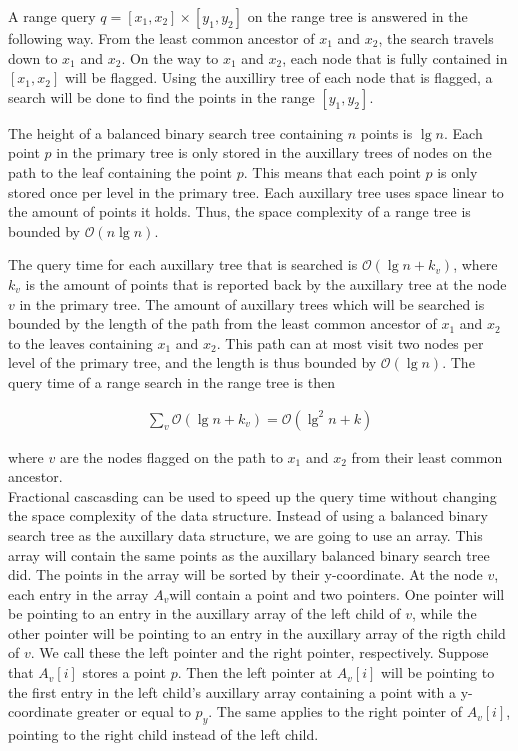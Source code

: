 A range query $q = [x_1, x_2] \times [y_1, y_2]$ on the range tree is answered in the following way. From the least common ancestor of $x_1$ and $x_2$, the search travels down to $x_1$ and $x_2$. On the way to $x_1$ and $x_2$, each node that is fully contained in $[x_1, x_2]$ will be flagged. Using the auxilliry tree of each node that is flagged, a search will be done to find the points in the range $[y_1, y_2]$.

The height of a balanced binary search tree containing $n$ points is $\lg n$. Each point $p$ in the primary tree is only stored in the auxillary trees of nodes on the path to the leaf containing the point $p$. This means that each point $p$ is only stored once per level in the primary tree. Each auxillary tree uses space linear to the amount of points it holds. Thus, the space complexity of a range tree is bounded by $\mathcal{O}(n \lg n)$.

The query time for each auxillary tree that is searched is $\mathcal{O}(\lg n + k_v)$, where $k_v$ is the amount of points that is reported back by the auxillary tree at the node $v$ in the primary tree. The amount of auxillary trees which will be searched is bounded by the length of the path from the least common ancestor of $x_1$ and $x_2$ to the leaves containing $x_1$ and $x_2$. This path can at most visit two nodes per level of the primary tree, and the length is thus bounded by $\mathcal{O}(\lg n)$. The query time of a range search in the range tree is then 

\begin{align*}
  \sum\limits_{v} \mathcal{O}(\lg n + k_v) = \mathcal{O}(\lg^2 n + k)
\end{align*}

\noindent where $v$ are the nodes flagged on the path to $x_1$ and $x_2$ from their least common ancestor. \\

Fractional cascasding can be used to speed up the query time without changing the space complexity of the data structure. Instead of using a balanced binary search tree as the auxillary data structure, we are going to use an array. This array will contain the same points as the auxillary balanced binary search tree did. The points in the array will be sorted by their y-coordinate. At the node $v$, each entry in the array $A_v$will contain a point and two pointers. One pointer will be pointing to an entry in the auxillary array of the left child of $v$, while the other pointer will be pointing to an entry in the auxillary array of the rigth child of $v$. We call these the left pointer and the right pointer, respectively. Suppose that $A_v[i]$ stores a point $p$. Then the left pointer at $A_v[i]$ will be pointing to the first entry in the left child's auxillary array containing a point with a y-coordinate greater or equal to $p_y$. The same applies to the right pointer of $A_v[i]$, pointing to the right child instead of the left child. \\

